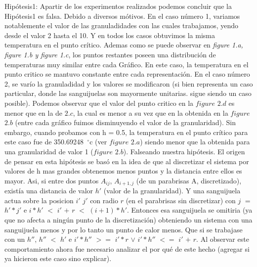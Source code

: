 \documentclass[a4paper]{article}
\begin{document}
Hipótesis1: Apartir de los experimentos realizados podemos concluir que la Hipótesis1 es falsa. Debido a diversos mótivos. En el caso número 1, variamos notablemente el valor de las granuladidades con las cuales trabajamos, yendo desde el valor 2 hasta el 10. Y en todos los casos obtuvimos la misma temperatura en el punto crítico. Ademas como se puede observar en \textit{figure 1.a, figure 1.b y figure 1.c}, los puntos restantes poseen una distribución de temperaturas muy similar entre cada Gráfico. En este caso, la temperatura en el punto critico se mantuvo constante entre cada representación.
En el caso número 2, se varío la granuladidad y los valores se modificaron (si bien representa un caso particular, donde las sanguijuelas son mayormente unitarias. sigue siendo un caso posible). Podemos observar que el valor del punto critico en la $figure$ $2.d$ es menor que en la de $2.c$, la cual es menor a su vez que en la obtenida en la $figure$ $2.b$  (entre cada gráfico fuimos disminuyendo el valor de la granularidad). Sin embargo, cuando probamos con h = 0.5, la temperatura en el punto crítico para este caso fue de 350.69248\hspace{-1.5mm}$\phantom{a}^{\circ}$c (ver $figure$ $2.a$) siendo menor que la obtenida para una granularidad de valor 1 ($figure$ $2.b$). Falseando nuestra hipótesis. \newline
El origen de pensar en esta hipótesis se basó en la idea de que al discretizar el sistema por valores de h mas grandes obtenemos menos puntos y la distancia entre ellos es mayor. Asi, si entre dos puntos $A_{ij}$, $A_{i+1,j}$ (de un parabrisas A, discretizado), existía una distancia de valor $h'$ (valor de la granularidad). Y una sanguijuela actua sobre la posicion $i'$ $j'$ con radio $r$ (en el parabrisas sin discretizar) con $j$ $=$ $h'*j'$ e $i*h'$ $<$ $i'$ $+$ $r$ $<$ $(i+1)*h'$. Entonces esa sanguijuela se omitiria (ya que no afecta a ningún punto de la discretización) obteniendo un sistema con una sanguijuela menos y por lo tanto un punto de calor menos. Que si se trabajase con un $h''$, $h''$ $<$ $h'$ e $i'*h''$ $>=$ $i'*r$ $\vee$ $i'*h''$ $<=$ $i'$ $+$ $r$. Al observar este comportamiento ahora fue necesario analizar el por qué de este hecho (agregar si ya hicieron este caso sino explicar).\newline \newline
\end{document}
